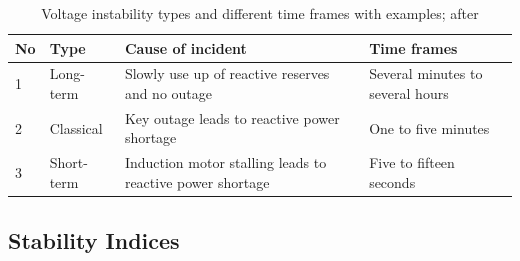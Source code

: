 \begin{table}
    \centering
    \caption{Voltage instability types and different time frames with examples; after \quelle}
    \small
    \renewcommand\tabularxcolumn[1]{m{#1}}
    \vspace*{12pt}
    \begin{tabularx}{\textwidth}{llXX}
        \toprule
        \textbf{No} & \textbf{Type} & \textbf{Cause of incident} & \textbf{Time frames} \\
        \toprule
        1 & Long-term & Slowly use up of reactive reserves and no outage & Several minutes to several hours \\
        2 & Classical & Key outage leads to reactive power shortage & One to five minutes \\
        3 & Short-term & Induction motor stalling leads to reactive power shortage & Five to fifteen seconds \\
        \bottomrule
    \end{tabularx}
\end{table}

\subsection{Stability Indices}

